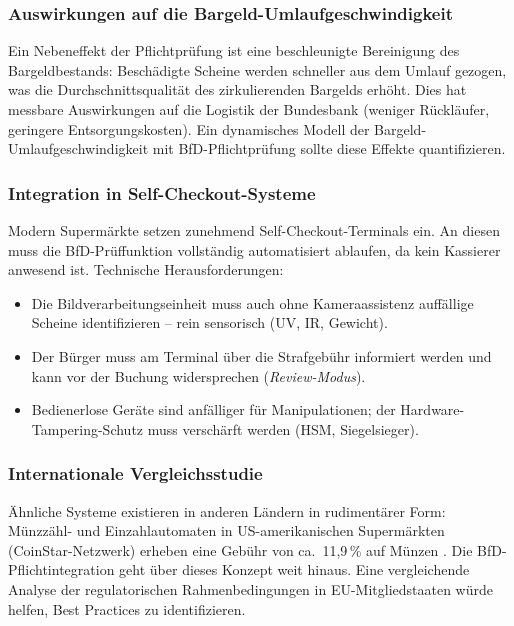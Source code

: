 ﻿\documentclass[a4paper,12pt]{article}
\theoremstyle{definition}
\begin{document}
\subsubsection{Auswirkungen auf die Bargeld-Umlaufgeschwindigkeit}

Ein Nebeneffekt der Pflichtprüfung ist eine beschleunigte Bereinigung
des Bargeldbestands: Beschädigte Scheine werden schneller aus dem Umlauf
gezogen, was die Durchschnittsqualität des zirkulierenden Bargelds erhöht.
Dies hat messbare Auswirkungen auf die Logistik der Bundesbank
(weniger Rückläufer, geringere Entsorgungskosten).
Ein dynamisches Modell der Bargeld-Umlaufgeschwindigkeit \cite{ross2014introduction}
mit BfD-Pflichtprüfung sollte diese Effekte quantifizieren.

\subsubsection{Integration in Self-Checkout-Systeme}

Modern Supermärkte setzen zunehmend Self-Checkout-Terminals ein.
An diesen muss die BfD-Prüffunktion vollständig automatisiert ablaufen,
da kein Kassierer anwesend ist.  Technische Herausforderungen:
\begin{itemize}
  \item Die Bildverarbeitungseinheit muss auch ohne Kameraassistenz
        auffällige Scheine identifizieren -- rein sensorisch (UV, IR, Gewicht).
  \item Der Bürger muss am Terminal über die Strafgebühr informiert werden
        und kann vor der Buchung widersprechen (\emph{Review-Modus}).
  \item Bedienerlose Geräte sind anfälliger für Manipulationen;
        der Hardware-Tampering-Schutz muss verschärft werden (HSM, Siegelsieger).
\end{itemize}

\subsubsection{Internationale Vergleichsstudie}

Ähnliche Systeme existieren in anderen Ländern in rudimentärer Form:
Münzzähl- und Einzahlautomaten in US-amerikanischen Supermärkten
(CoinStar-Netzwerk) erheben eine Gebühr von ca.\ 11,9\,\% auf Münzen \cite{coinstar2024}.
Die BfD-Pflichtintegration geht über dieses Konzept weit hinaus.
Eine vergleichende Analyse der regulatorischen Rahmenbedingungen in
EU-Mitgliedstaaten würde helfen, Best Practices zu identifizieren.
\end{document}
